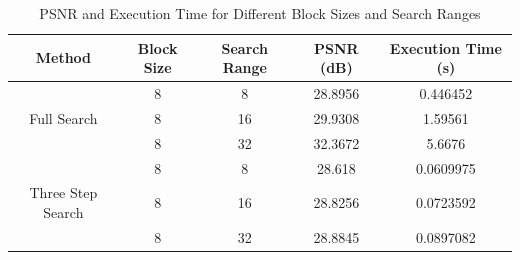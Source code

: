 \documentclass{homework}
\begin{document}
\begin{table}[H]
    \centering
    \begin{tabular}{|c|c|c|c|c|}
        \hline
        Method & Block Size & Search Range & PSNR (dB) & Execution Time (s) \\
        \hline
        & 8 & 8 & \num{28.8956} & \num{0.446452} \\
        Full Search & 8 & 16 & \num{29.9308} & \num{1.59561} \\
        & 8 & 32 & \num{32.3672} & \num{5.6676} \\
        \hline
        & 8 & 8 & \num{28.618} & \num{0.0609975} \\
        Three Step Search & 8 & 16 & \num{28.8256} & \num{0.0723592} \\
        & 8 & 32 & \num{28.8845} & \num{0.0897082} \\
        \hline
    \end{tabular}
    \caption{PSNR and Execution Time for Different Block Sizes and Search Ranges}
\end{table}
\end{document}
